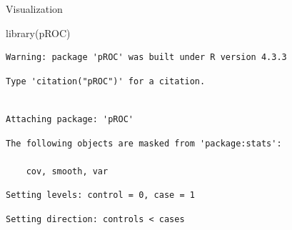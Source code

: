\documentclass[
  letterpaper,
  DIV=11,
  numbers=noendperiod]{scrartcl}
\newenvironment{Shaded}{\begin{snugshade}}{\end{snugshade}}
\newcommand{\FunctionTok}[1]{\textcolor[rgb]{0.28,0.35,0.67}{#1}}
\newcommand{\NormalTok}[1]{\textcolor[rgb]{0.00,0.23,0.31}{#1}}
\newcommand{\OtherTok}[1]{\textcolor[rgb]{0.00,0.23,0.31}{#1}}
\newcommand{\SpecialCharTok}[1]{\textcolor[rgb]{0.37,0.37,0.37}{#1}}
\begin{document}
Visualization

\begin{Shaded}
\begin{Highlighting}[]
\FunctionTok{library}\NormalTok{(pROC)}
\end{Highlighting}
\end{Shaded}

\begin{verbatim}
Warning: package 'pROC' was built under R version 4.3.3
\end{verbatim}

\begin{verbatim}
Type 'citation("pROC")' for a citation.
\end{verbatim}

\begin{verbatim}

Attaching package: 'pROC'
\end{verbatim}

\begin{verbatim}
The following objects are masked from 'package:stats':

    cov, smooth, var
\end{verbatim}

\begin{Shaded}
\end{Shaded}

\begin{verbatim}
Setting levels: control = 0, case = 1
\end{verbatim}

\begin{verbatim}
Setting direction: controls < cases
\end{verbatim}
\end{document}
